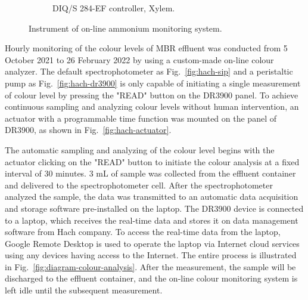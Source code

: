 \begin{figure}[h]
\begin{subfigure}{0.3\textwidth}
      \caption{DIQ/S 284-EF controller, Xylem.} \label{fig:nh3-sensor-b}
    \end{subfigure}%
  \caption{Instrument of on-line ammonium monitoring system.} \label{fig:nh3-sensor}
\end{figure}

Hourly monitoring of the colour levels of MBR effluent was conducted from 5 October 2021 to 26 February 2022 by using a custom-made on-line colour analyzer. The default spectrophotometer as Fig.~\ref{fig:hach-sip} and a peristaltic pump as Fig.~\ref{fig:hach-dr3900} is only capable of initiating a single measurement of colour level by pressing the "READ" button on the DR3900 panel. To achieve continuous sampling and analyzing colour levels without human intervention, an actuator with a programmable time function was mounted on the panel of DR3900, as shown in Fig.~\ref{fig:hach-actuator}. 

The automatic sampling and analyzing of the colour level begins with the actuator clicking on the "READ" button to initiate the colour analysis at a fixed interval of 30 minutes. 3 mL of sample was collected from the effluent container and delivered to the spectrophotometer cell. After the spectrophotometer analyzed the sample, the data was transmitted to an automatic data acquisition and storage software pre-installed on the laptop. The DR3900 device is connected to a laptop, which receives the real-time data and stores it on data management software from Hach company. To access the real-time data from the laptop, Google Remote Desktop is used to operate the laptop via Internet cloud services using any devices having access to the Internet. The entire process is illustrated in Fig.~\ref{fig:diagram-colour-analysis}. After the measurement, the sample will be discharged to the effluent container, and the on-line colour monitoring system is left idle until the subsequent measurement.

